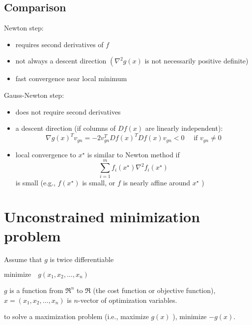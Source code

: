 \subsection{Comparison}

Newton step:
\begin{itemize}
    \item requires second derivatives of $ f $
    \item not always a descent direction $ \left(\nabla^{2} g(x)\right. $ is not necessarily positive definite)
    \item fast convergence near local minimum
\end{itemize}


Gauss-Newton step:
\begin{itemize}
    \item does not require second derivatives
    \item a descent direction (if columns of $ D f(x) $ are linearly independent):
    \begin{equation}
    \nabla g(x)^{T} v_{{gn}}=-2 v_{{gn}}^{T} D f(x)^{T} D f(x) v_{{gn}}<0 \quad \text { if } v_{{gn}} \neq 0
    \end{equation}
    \item local convergence to $ x^{\star} $ is similar to Newton method if
\begin{equation}
\sum_{i=1}^{m} f_{i}\left(x^{\star}\right) \nabla^{2} f_{i}\left(x^{\star}\right)
\end{equation}
is small (e.g., $ f\left(x^{\star}\right) $ is small, or $ f $ is nearly affine around $ x^{\star} $ )
\end{itemize}


\section{Unconstrained minimization problem}

\begin{problem}
    Assume that $ g $ is twice differentiable

    $\text{minimize} \quad g\left(x_{1}, x_{2}, \ldots, x_{n}\right) $

    $ g $ is a function from $ \mathfrak{R}^{n} $ to $ \mathfrak{R} $ (the cost function or objective function), $ x=\left(x_{1}, x_{2}, \ldots, x_{n}\right) $ is $ n $-vector of optimization variables.
\end{problem}

to solve a maximization problem (i.e., maximize $ g(x) $ ), minimize $ -g(x) $.

